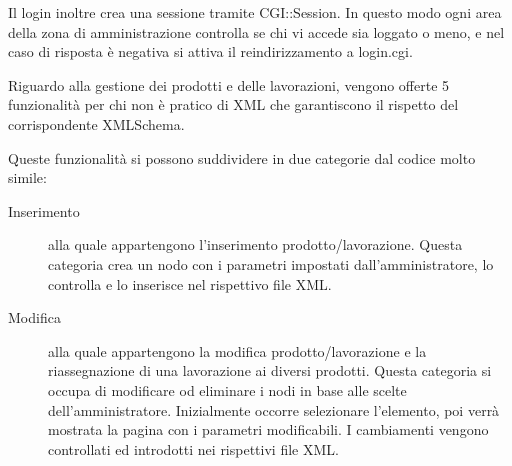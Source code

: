 \documentclass[11pt]{article}
\begin{document}
Il login inoltre crea una sessione tramite CGI::Session.
In questo modo ogni area della zona di amministrazione controlla se chi vi accede sia loggato o meno, e nel caso di risposta è negativa si attiva il reindirizzamento a login.cgi.

Riguardo alla gestione dei prodotti e delle lavorazioni, vengono offerte 5 funzionalità per chi non è pratico di XML che garantiscono il rispetto del corrispondente XMLSchema.

Queste funzionalità si possono suddividere in due categorie dal codice molto simile:

\begin{description}
	\item[Inserimento] alla quale appartengono l'inserimento prodotto/lavorazione. Questa categoria crea un nodo con i parametri impostati dall'amministratore, lo controlla e lo inserisce nel rispettivo file XML.
	\item[Modifica] alla quale appartengono la modifica prodotto/lavorazione e la riassegnazione di una lavorazione ai diversi prodotti.
	Questa categoria si occupa di modificare od eliminare i nodi in base alle scelte dell'amministratore. Inizialmente occorre selezionare l'elemento, poi verrà mostrata la pagina con i parametri modificabili. I cambiamenti vengono controllati ed introdotti nei rispettivi file XML.
\end{description}
\end{document}
